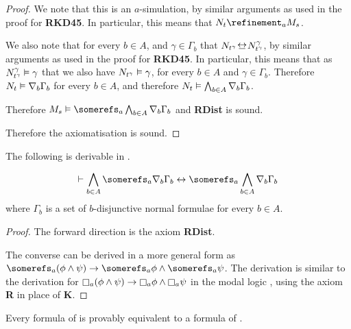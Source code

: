 \begin{proof}
We note that this is an $a$-simulation, by similar arguments as used in the
proof for {\bf RKD45}. In particular, this means that $N_t \refinement_a M_s$.

We also note that for every $b \in A$, and $\gamma \in \Gamma_b$ that
$N_{t^\gamma} \bisim N^\gamma_{t^\gamma}$, by similar arguments as used in the
proof for {\bf RKD45}. In particular, this means that as $N^\gamma_{t^\gamma}
\vDash \gamma$ that we also have $N_{t^\gamma} \vDash \gamma$, for every $b
\in A$ and $\gamma \in \Gamma_b$. Therefore $N_t \vDash \nabla_b \Gamma_b$
for every $b \in A$, and therefore $N_t \vDash \bigwedge_{b \in A} \nabla_b
\Gamma_b$.

Therefore $M_s \entails \somerefs_a \bigwedge_{b \in A} \covers_b \Gamma_b$ and
{\bf RDist} is sound.

Therefore the axiomatisation \axiomKDF{} is sound.
\end{proof}

\begin{lemma}
The following is derivable in \axiomKDF{}.

$$
\proves \bigwedge_{b \in A} \somerefs_a \covers_b \Gamma_b \iff
\somerefs_a \bigwedge_{b \in A} \covers_b \Gamma_b \\
$$
where $\Gamma_b$ is a set of $b$-disjunctive normal formulae for
every $b \in A$.
\end{lemma}

\begin{proof}
The forward direction is the axiom {\bf RDist}. 

The converse can be derived in a more general form as $\somerefs_a (\phi \land
\psi) \implies \somerefs_a \phi \land \somerefs_a \psi$. The derivation is
similar to the derivation for $\knows_a (\phi \land \psi) \implies \knows_a \phi
\land \knows_a \psi$ in the modal logic \logicK{}, using the axiom {\bf R} in
place of {\bf K}.
\end{proof}

\begin{lemma}\label{kd45-translation}
Every formula of \logicKDF{} is provably equivalent to a formula of \logicKD{}.
\end{lemma}

